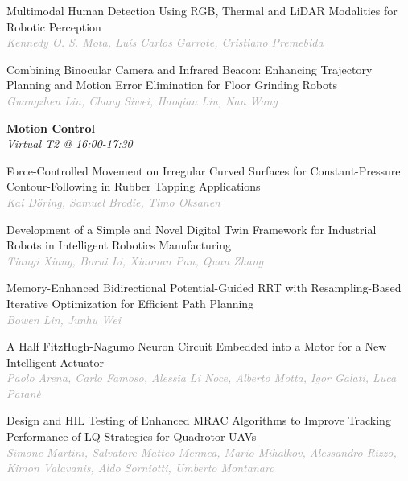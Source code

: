 \begin{multicols*}{2}
\small Multimodal Human Detection Using RGB, Thermal and LiDAR Modalities for Robotic Perception\\ 
\footnotesize \textcolor{darkgray}{\textit{Kennedy O. S. Mota, Luís Carlos  Garrote, Cristiano  Premebida}}

\small Combining Binocular Camera and Infrared Beacon: Enhancing Trajectory Planning and Motion Error Elimination for Floor Grinding Robots\\ 
\footnotesize \textcolor{darkgray}{\textit{Guangzhen Lin, Chang  Siwei, Haoqian  Liu, Nan  Wang}}

\normalsize \textbf{Motion Control}\\
\small \textit{Virtual T2 @ 16:00-17:30}

\small Force-Controlled Movement on Irregular Curved Surfaces for Constant-Pressure Contour-Following in Rubber Tapping Applications\\ 
\footnotesize \textcolor{darkgray}{\textit{Kai Döring, Samuel  Brodie, Timo  Oksanen}}

\small Development of a Simple and Novel Digital Twin Framework for Industrial Robots in Intelligent Robotics Manufacturing\\ 
\footnotesize \textcolor{darkgray}{\textit{Tianyi Xiang, Borui  Li, Xiaonan  Pan, Quan  Zhang}}

\small Memory-Enhanced Bidirectional Potential-Guided RRT with Resampling-Based Iterative Optimization for Efficient Path Planning\\ 
\footnotesize \textcolor{darkgray}{\textit{Bowen Lin, Junhu  Wei}}

\small A Half FitzHugh-Nagumo Neuron Circuit Embedded into a Motor for a New Intelligent Actuator\\ 
\footnotesize \textcolor{darkgray}{\textit{Paolo Arena, Carlo  Famoso, Alessia  Li Noce, Alberto  Motta, Igor  Galati, Luca  Patanè}}

\small Design and HIL Testing of Enhanced MRAC Algorithms to Improve Tracking Performance of LQ-Strategies for Quadrotor UAVs\\ 
\footnotesize \textcolor{darkgray}{\textit{Simone Martini, Salvatore Matteo  Mennea, Mario  Mihalkov, Alessandro  Rizzo, Kimon  Valavanis, Aldo  Sorniotti, Umberto  Montanaro}}

\end{multicols*}